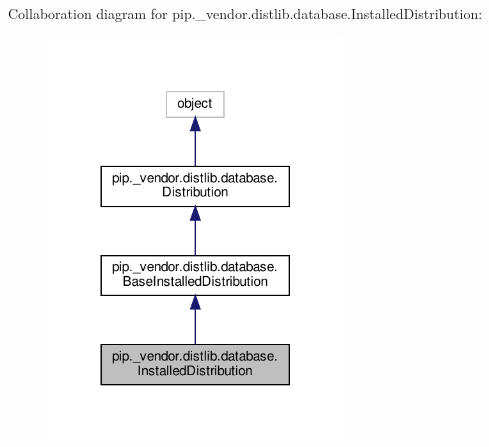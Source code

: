 Collaboration diagram for pip.\+\_\+vendor.\+distlib.\+database.\+Installed\+Distribution\+:
\nopagebreak
\begin{figure}[H]
\begin{center}
\leavevmode
\includegraphics[width=221pt]{classpip_1_1__vendor_1_1distlib_1_1database_1_1InstalledDistribution__coll__graph}
\end{center}
\end{figure}
